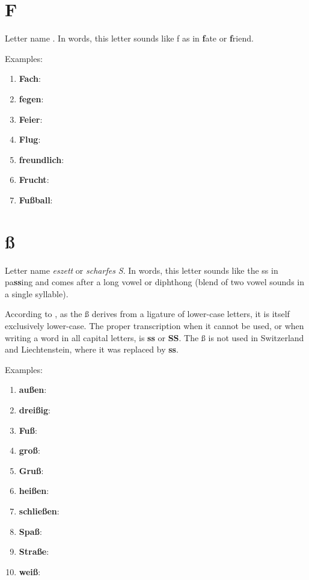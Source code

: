\section*{F}

Letter name \textipa{[Ef]}. In words, this letter sounds like f as in \textbf{f}ate or \textbf{f}riend.

Examples:
\begin{enumerate}
    \item \textbf{Fach}: \textipa{[fax]}
    \item \textbf{fegen}: \textipa{["fe:g@n]}
    \item \textbf{Feier}: \textipa{["faI@r]}
    \item \textbf{Flug}: \textipa{[flu:k]}
    \item \textbf{freundlich}: \textipa{["frOYntli\c{c}]}
    \item \textbf{Frucht}: \textipa{[frUxt]}
    \item \textbf{Fußball}: \textipa{["fu:sbal]}
\end{enumerate}

\section*{ß}

Letter name \textit{eszett} or \textit{scharfes S}. In words, this letter sounds like the ss in pa\textbf{ss}ing and comes after a long vowel or diphthong (blend of two vowel sounds in a single syllable).

According to \cite{wiki_germanalpha}, as the ß derives from a ligature of lower-case letters, it is itself exclusively lower-case. The proper transcription when it cannot be used, or when writing a word in all capital letters, is \textbf{ss} or \textbf{SS}. The ß is not used in Switzerland and Liechtenstein, where it was replaced by \textbf{ss}.

Examples:
\begin{enumerate}
    \item \textbf{außen}: \textipa{["aUs@n]}
    \item \textbf{dreißig}: \textipa{["draIsI\c{c}]}
    \item \textbf{Fuß}: \textipa{[fu:s]}
    \item \textbf{groß}: \textipa{[gro:s]}
    \item \textbf{Gruß}: \textipa{[gru:s]}
    \item \textbf{heißen}: \textipa{["haIs@n]}
    \item \textbf{schließen}: \textipa{["Sli:s@n]}
    \item \textbf{Spaß}: \textipa{[Spa:s]}
    \item \textbf{Straße}: \textipa{["Stra:s@]}
    \item \textbf{weiß}: \textipa{[vaIs]}
\end{enumerate}


